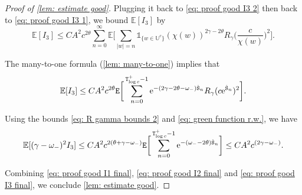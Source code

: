 \documentclass[12pt]{article}
\numberwithin{equation}{section}
\theoremstyle{plain}
\theoremstyle{definition}
\begin{document}
\begin{proof}[Proof of \cref{lem: estimate good}]
\noindent Plugging it back to \eqref{eq: proof good I3 2} then back to \eqref{eq: proof good I3 1}, we bound $\mathbb{E}[I_3]$ by
\[\mathbb{E}[I_3]\leq C A^2 c^{2\theta}\sum^{\infty}_{n=0} \mathbb{E}\bigg[\sum_{|w| = n}\mathds{1}_{\{w\in\mathbb{U}^c\}}(\chi(w))^{2\gamma-2\theta}R_{\gamma}\Big(\frac{c}{\chi(w)}\Big)^2\bigg]. \]

\noindent The many-to-one formula (\cref{lem: many-to-one}) implies that
\[\mathbb{E}[I_3]\leq C A^2 c^{2\theta}{\tt E}\bigg[\sum^{{\tt T}_{\log c}^+-1}_{n=0}\mathrm{e}^{-(2\gamma-2\theta-\omega_-){\hat{\tt S}}_n} R_{\gamma}(c\mathrm{e}^{{\hat{\tt S}}_n})^2\bigg].\]

\noindent Using the bounds \eqref{eq: R gamma bounds 2} and \eqref{eq: green function r.w.}, we have
\begin{equation}\label{eq: proof good I3 final}
\mathbb{E}[(\gamma-\omega_-)^2I_3]\leq CA^2c^{2(\theta+\gamma-\omega_-)}{\tt E}\bigg[\sum^{{\tt T}_{\log c}^+-1}_{n=0}\mathrm{e}^{-(\omega_--2\theta){\hat{\tt S}}_n}\bigg]\leq CA^2c^{(2\gamma-\omega_-)}.
\end{equation}

Combining \eqref{eq: proof good I1 final}, \eqref{eq: proof good I2 final} and \eqref{eq: proof good I3 final}, we conclude \cref{lem: estimate good}.
\end{proof}




\end{document}
